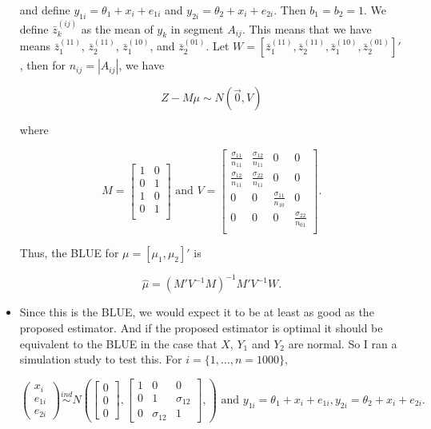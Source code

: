 \documentclass[12pt]{article}
\begin{document}
\begin{itemize}
    and define $y_{1i} = \theta_1 + x_i + e_{1i}$ and $y_{2i} = \theta_2 + x_i
    + e_{2i}$. Then $b_1 = b_2 = 1$. We define $\bar z_k^{(ij)}$ as the mean of
    $y_k$ in segment $A_{ij}$. This means that we have means $\bar z_1^{(11)}$,
    $\bar z_2^{(11)}$, $\bar z_1^{(10)}$, and $\bar z_2^{(01)}$. Let $W = [\bar
    z_1^{(11)}, \bar z_2^{(11)}, \bar z_1^{(10)}, \bar z_2^{(01)}]'$, then for
    $n_{ij} = |A_{ij}|$, we have

    \[Z - M \mu \sim N(\vec 0, V)\]

    where 

    \[M = 
      \begin{bmatrix}
        1 & 0 \\
        0 & 1 \\
        1 & 0 \\
        0 & 1 \\
      \end{bmatrix}
      \text{ and }
      V = 
      \begin{bmatrix}
        \frac{\sigma_{11}}{n_{11}} & \frac{\sigma_{12}}{n_{11}} & 0 & 0 \\
        \frac{\sigma_{12}}{n_{11}} & \frac{\sigma_{22}}{n_{11}} & 0 & 0 \\
        0 & 0 & \frac{\sigma_{11}}{n_{10}} & 0 \\
        0 & 0 & 0 & \frac{\sigma_{22}}{n_{01}} \\
      \end{bmatrix}.
    \]

    Thus, the BLUE for $\mu = [\mu_1, \mu_2]'$ is 

    \begin{equation}\label{eq:wls}
    \hat \mu = (M' V^{-1} M)^{-1} M' V^{-1} W.
    \end{equation}

  \item Since this is the BLUE, we would expect it to be at least as good as
    the proposed estimator. And if the proposed estimator is optimal it should
    be equivalent to the BLUE in the case that $X$, $Y_1$ and $Y_2$ are normal.
    So I ran a simulation study to test this. For $i = \{1, \dots, n = 1000\}$,

    \[
      \begin{pmatrix}
        x_i \\ e_{1i} \\ e_{2i}
      \end{pmatrix} \stackrel{ind}{\sim}
      N \left(
      \begin{bmatrix}
        0 \\ 0 \\ 0
      \end{bmatrix},
      \begin{bmatrix}
        1 & 0 & 0 \\
        0 & 1 & \sigma_{12} \\ 
        0 & \sigma_{12} & 1 
      \end{bmatrix},
      \right) \text{ and }
      y_{1i} = \theta_1 + x_i + e_{1i}, y_{2i} = \theta_2 + x_i + e_{2i}.
    \]


\end{itemize}
\end{document}
